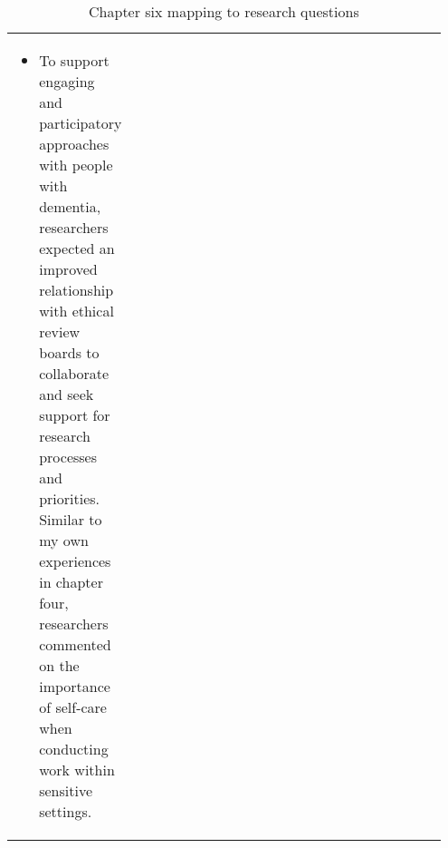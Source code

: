 \begin{table}[htp]
\begin{tabular}{p{0.15\linewidth} | p{0.8\linewidth}}
\begin{itemize}
        \item To support engaging and participatory approaches with people with dementia, researchers expected an improved relationship with ethical review boards to collaborate and seek support for research processes and priorities. Similar to my own experiences in chapter four, researchers commented on the importance of self-care when conducting work within sensitive settings. 
      \end{itemize}
    \\ 
    
    \end{tabular}
    \caption{Chapter six mapping to research questions}
    \label{chapterSixRQ}
\end{table}



